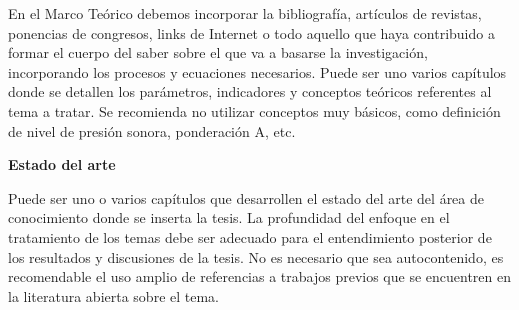 En el Marco Teórico debemos incorporar la bibliografía, artículos de revistas, ponencias de congresos, links de Internet o todo aquello que haya contribuido a formar el cuerpo del saber sobre el que va a basarse la investigación, incorporando los procesos y ecuaciones necesarios.  
Puede ser uno varios capítulos donde se detallen los parámetros, indicadores y conceptos teóricos referentes al tema a tratar. Se recomienda no utilizar conceptos muy básicos, como definición de nivel de presión sonora, ponderación A, etc.

\textbf{Estado del arte}

Puede ser uno o varios capítulos que desarrollen el estado del arte del área de conocimiento donde se inserta la tesis. La profundidad del enfoque en el tratamiento de los temas debe ser adecuado para el entendimiento posterior de los resultados y discusiones de la tesis. No es necesario que sea autocontenido, es recomendable el uso amplio de referencias a trabajos previos que se encuentren en la literatura abierta sobre el tema.